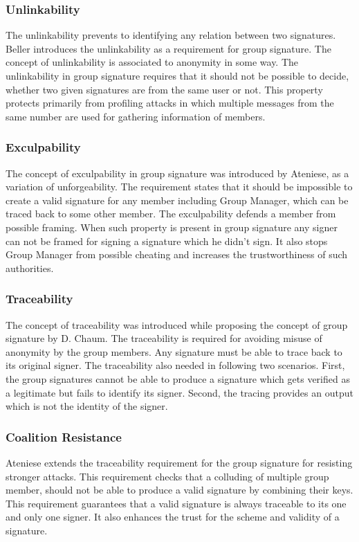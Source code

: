 \subsubsection{Unlinkability}
The unlinkability prevents to identifying any relation between two signatures. Beller introduces the unlinkability as a requirement for group signature\cite{bellare2003foundations}. The concept of unlinkability is associated to anonymity in some way. The unlinkability in group signature requires that it should not be possible to decide, whether two given signatures are from the same user or not. This property protects primarily from profiling attacks in which multiple messages from the same number are used for gathering information of members.
\subsubsection{Exculpability}
The concept of exculpability in group signature was introduced by Ateniese, as a variation of unforgeability\cite{ateniese1999some}. The requirement states that it should be impossible to create a valid signature for any member including Group Manager, which can be traced back to some other member. The exculpability defends a member from possible framing. When such property is present in group signature any signer can not be framed for signing a signature which he didn't sign. It also stops Group Manager from possible cheating and increases the trustworthiness of such authorities.
\subsubsection{Traceability}
The concept of traceability was introduced while proposing the concept of group signature by D. Chaum\cite{chaum1991group}. The traceability is required for avoiding misuse of anonymity by the group members.  Any signature must be able to trace back to its original signer. The traceability also needed in following two scenarios. First, the group signatures cannot be able to produce a signature which gets verified as a legitimate but fails to identify its signer. Second, the tracing provides an output which is not the identity of the signer.
\subsubsection{Coalition Resistance}
Ateniese extends the traceability requirement for the group signature for resisting stronger attacks\cite{ateniese1999some}. This requirement checks that a colluding of multiple group member, should not be able to produce a valid signature by combining their keys. This requirement guarantees that a valid signature is always traceable to its one and only one signer. It also enhances the trust for the scheme and validity of a signature.
